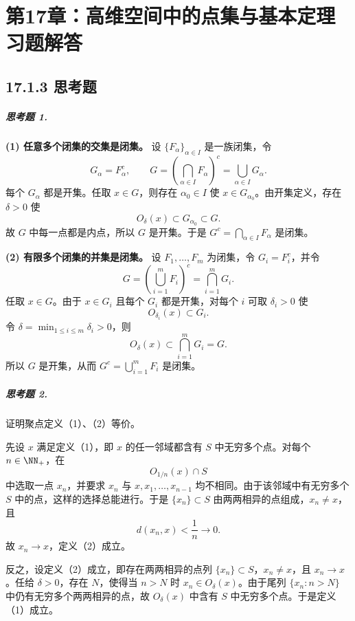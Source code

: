 
\chapter*{第17章：高维空间中的点集与基本定理习题解答}

\section*{17.1.3 思考题}

\paragraph{思考题 1.}
\begin{xsolution}
\textbf{(1) 任意多个闭集的交集是闭集。}
设 $\{F_\alpha\}_{\alpha\in I}$ 是一族闭集，令
\[
  G_\alpha=F_\alpha^c,
  \qquad
  G=\left(\bigcap_{\alpha\in I}F_\alpha\right)^c
   =\bigcup_{\alpha\in I}G_\alpha.
\]
每个 $G_\alpha$ 都是开集。任取 $x\in G$，则存在 $\alpha_0\in I$ 使 $x\in G_{\alpha_0}$。由开集定义，存在 $\delta>0$ 使
\[
  O_\delta(x)\subset G_{\alpha_0}\subset G.
\]
故 $G$ 中每一点都是内点，所以 $G$ 是开集。于是 $G^c=\bigcap_{\alpha\in I}F_\alpha$ 是闭集。

\textbf{(2) 有限多个闭集的并集是闭集。}
设 $F_1,\ldots,F_m$ 为闭集，令 $G_i=F_i^c$，并令
\[
  G=\left(\bigcup_{i=1}^mF_i\right)^c
   =\bigcap_{i=1}^mG_i.
\]
任取 $x\in G$。由于 $x\in G_i$ 且每个 $G_i$ 都是开集，对每个 $i$ 可取 $\delta_i>0$ 使
\[
  O_{\delta_i}(x)\subset G_i.
\]
令 $\delta=\min_{1\leq i\leq m}\delta_i>0$，则
\[
  O_\delta(x)\subset\bigcap_{i=1}^mG_i=G.
\]
所以 $G$ 是开集，从而 $G^c=\bigcup_{i=1}^mF_i$ 是闭集。
\end{xsolution}

\paragraph{思考题 2.}
\begin{xsolution}
证明聚点定义（1）、（2）等价。

先设 $x$ 满足定义（1），即 $x$ 的任一邻域都含有 $S$ 中无穷多个点。对每个 $n\in\NN_+$，在
\[
  O_{1/n}(x)\cap S
\]
中选取一点 $x_n$，并要求 $x_n$ 与 $x,x_1,\ldots,x_{n-1}$ 均不相同。由于该邻域中有无穷多个 $S$ 中的点，这样的选择总能进行。于是 $\{x_n\}\subset S$ 由两两相异的点组成，$x_n\neq x$，且
\[
  d(x_n,x)<\frac1n\to0.
\]
故 $x_n\to x$，定义（2）成立。

反之，设定义（2）成立，即存在两两相异的点列 $\{x_n\}\subset S$，$x_n\neq x$，且 $x_n\to x$。任给 $\delta>0$，存在 $N$，使得当 $n>N$ 时 $x_n\in O_\delta(x)$。由于尾列 $\{x_n:n>N\}$ 中仍有无穷多个两两相异的点，故 $O_\delta(x)$ 中含有 $S$ 中无穷多个点。于是定义（1）成立。
\end{xsolution}

